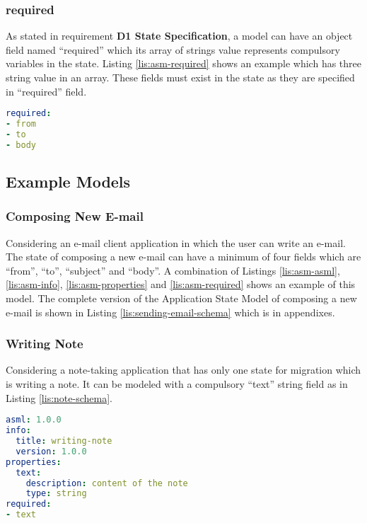 \subsubsection{required}
As stated in requirement \textbf{D1 State Specification}, a model can have an object field named “required” which its array of strings value represents compulsory variables in the state.
Listing \ref{lis:asm-required} shows an example which has three string value in an array. These fields must exist in the state as they are specified in “required” field.

\lstset{
  label=lis:asm-required, caption=Application State Model “required” field example.
}
\begin{lstlisting}[language=yaml]
required:
- from
- to
- body

\end{lstlisting}

\subsection{Example Models}
\subsubsection{Composing New E-mail}
Considering an e-mail client application in which the user can write an e-mail. The state of composing a new e-mail can have a minimum of four fields which are “from”, “to”, “subject” and “body”. A combination of Listings \ref{lis:asm-asml},  \ref{lis:asm-info},  \ref{lis:asm-properties} and  \ref{lis:asm-required} shows an example of this model.
The complete version of the Application State Model of composing a new e-mail is shown in  Listing \ref{lis:sending-email-schema} which is in appendixes.
\subsubsection{Writing Note}
Considering a note-taking application that has only one state for migration which is writing a note. It can be modeled with a compulsory “text” string field as in Listing \ref{lis:note-schema}.

\lstset{
  label=lis:note-schema, caption=Note Writing example Application State Model as JSON Schema in YAML.
}
\begin{lstlisting}[language=yaml]
asml: 1.0.0
info:
  title: writing-note
  version: 1.0.0
properties:
  text:
    description: content of the note
    type: string
required:
- text

\end{lstlisting}
